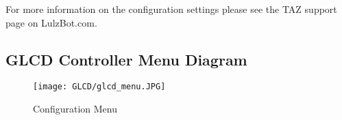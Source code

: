 For more information on the configuration settings please see the TAZ support page on LulzBot.com.

\subsection{GLCD Controller Menu Diagram}
\begin{figure}[H]
\centering
\texttt{[image: GLCD/glcd\_menu.JPG]}
\caption{Configuration Menu}
\label{fig:configuration_menu}
\end{figure}




